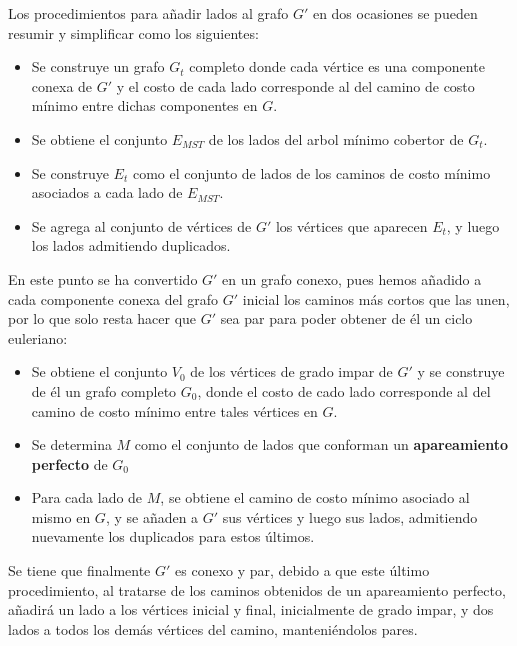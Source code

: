 \documentclass[11pt]{article}
\begin{document}
Los procedimientos para añadir lados al grafo $G'$ en dos ocasiones
se pueden resumir y simplificar como los siguientes:

\begin{itemize}
   \item Se construye un grafo $G_t$ completo donde cada vértice
   es una componente conexa de $G'$ y el costo de cada lado corresponde
   al del camino de costo mínimo entre dichas componentes en $G$.
   
   \item Se obtiene el conjunto $E_{MST}$ de los lados del arbol mínimo
   cobertor de $G_t$.

   \item Se construye $E_t$ como el conjunto de lados de los
   caminos de costo mínimo asociados a cada lado de $E_{MST}$.

   \item Se agrega al conjunto de vértices de $G'$ los
   vértices que aparecen $E_t$, y luego los lados admitiendo
   duplicados.
\end{itemize}

En este punto se ha convertido $G'$ en un grafo conexo, pues
hemos añadido a cada componente conexa del grafo $G'$ inicial
los caminos más cortos que las unen, por lo que solo resta
hacer que $G'$ sea par para poder obtener de él un ciclo
euleriano:

\begin{itemize}
   \item Se obtiene el conjunto $V_0$ de los vértices de 
   grado impar de $G'$ y se construye de él un grafo completo
   $G_0$, donde el costo de cado lado corresponde al del camino
   de costo mínimo entre tales vértices en $G$.

   \item Se determina $M$ como el conjunto de lados que conforman
   un \textbf{apareamiento perfecto} de $G_0$
   
   \item Para cada lado de $M$, se obtiene el camino de costo
   mínimo asociado al mismo en $G$, y se añaden a $G'$ sus
   vértices y luego sus lados, admitiendo nuevamente los
   duplicados para estos últimos.
\end{itemize}

Se tiene que finalmente $G'$ es conexo y par, debido a que este
último procedimiento, al tratarse de los caminos obtenidos de
un apareamiento perfecto, añadirá un lado a los vértices inicial y final,
inicialmente de grado impar, y dos lados a todos los demás vértices
del camino, manteniéndolos pares. \\
\end{document}
